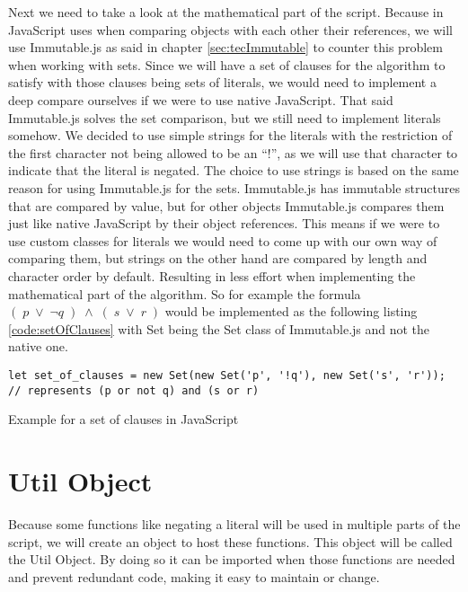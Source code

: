 Next we need to take a look at the mathematical part of the script. Because in JavaScript uses when comparing objects with each other their references, we will use Immutable.js as said in chapter \ref{sec:tecImmutable} to counter this problem when working with sets. Since we will have a set of clauses for the algorithm to satisfy with those clauses being sets of literals, we would need to implement a deep compare ourselves if we were to use native JavaScript. That said Immutable.js solves the set comparison, but we still need to implement literals somehow. We decided to use simple strings for the literals with the restriction of the first character not being allowed to be an ``!'', as we will use that character to indicate that the literal is negated. The choice to use strings is based on the same reason for using Immutable.js for the sets. Immutable.js has immutable structures that are compared by value, but for other objects Immutable.js compares them just like native JavaScript by their object references. This means if we were to use custom classes for literals we would need to come up with our own way of comparing them, but strings on the other hand are compared by length and character order by default. Resulting in less effort when implementing the mathematical part of the algorithm.
So for example the formula $(\; p\; \lor\; \neg q\; )\; \land\; (\; s\; \lor\; r\; )$ would be implemented as the following listing \ref{code:setOfClauses} with Set being the Set class of Immutable.js and not the native one.

\begin{listing}[h!]
\begin{verbatim}
let set_of_clauses = new Set(new Set('p', '!q'), new Set('s', 'r'));
// represents (p or not q) and (s or r)
\end{verbatim}
    \caption{Example for a set of clauses in JavaScript}
    \label{code:setOfClauses}
\end{listing}

\section{Util Object}
\label{sec:impUtil}
Because some functions like negating a literal will be used in multiple parts of the script, we will create an object to host these functions. This object will be called the Util Object. By doing so it can be imported when those functions are needed and prevent redundant code, making it easy to maintain or change.

